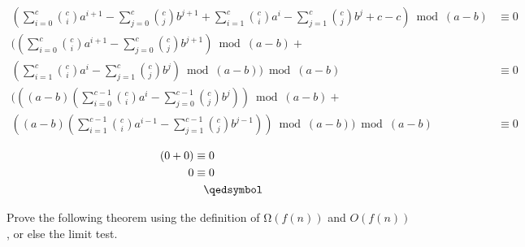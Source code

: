 \documentclass[12pt]{article}
\begin{document}
\begin{enumerate}
\begin{align*}
(\sum\limits_{i = 0}^{c} {c \choose i} a^{i+1} - \sum\limits_{j = 0}^{c} {c \choose j} b^{j+1} + \sum\limits_{i = 1}^{c} {c \choose i} a^i - \sum\limits_{j = 1}^{c} {c \choose j} b^j + c - c)\bmod{(a-b)} &\equiv 0\\
((\sum\limits_{i = 0}^{c} {c \choose i} a^{i+1} - \sum\limits_{j = 0}^{c} {c \choose j} b^{j+1})\bmod{(a-b)} +\\ (\sum\limits_{i = 1}^{c} {c \choose i} a^i - \sum\limits_{j = 1}^{c} {c \choose j} b^j)\bmod{(a-b)})\bmod{(a-b)} &\equiv 0\\
(((a-b)(\sum\limits_{i = 0}^{c-1} {c \choose i} a^{i} - \sum\limits_{j = 0}^{c-1} {c \choose j} b^{j}))\bmod{(a-b)} +\\ ((a-b)(\sum\limits_{i = 1}^{c-1} {c \choose i} a^{i-1} - \sum\limits_{j = 1}^{c-1} {c \choose j} b^{j-1}))\bmod{(a-b)})\bmod{(a-b)} &\equiv 0\\
\end{align*}
\begin{align*}
(0 + 0) &\equiv 0\\
0 &\equiv 0 \\
&\hspace{0.3cm}\qedsymbol
\end{align*}
\end{enumerate}
Prove the following theorem using the definition of \begin{math}Ω(f (n))\end{math} and \begin{math}O(f (n))\end{math} , or else the limit test.
\end{document}
